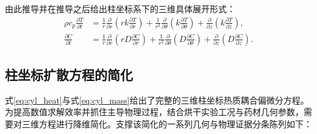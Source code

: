 \documentclass[12pt,a4paper]{ctexart}
\begin{document}
由此推导并在推导之后给出柱坐标系下的三维具体展开形式：
\begin{align}
\rho c_p\frac{\partial T}{\partial t}
&=\frac1r\frac{\partial}{\partial r}\left(rk\frac{\partial T}{\partial r}\right)
+\frac{1}{r^2}\frac{\partial}{\partial\theta}\left(k\frac{\partial T}{\partial\theta}\right)
+\frac{\partial}{\partial z}\left(k\frac{\partial T}{\partial z}\right),\label{eq:cyl_heat}\\[10pt]
\frac{\partial C}{\partial t}
&=\frac1r\frac{\partial}{\partial r}\left(rD\frac{\partial C}{\partial r}\right)
+\frac{1}{r^2}\frac{\partial}{\partial\theta}\left(D\frac{\partial C}{\partial\theta}\right)
+\frac{\partial}{\partial z}\left(D\frac{\partial C}{\partial z}\right).\label{eq:cyl_mass}
\end{align}

\subsection{柱坐标扩散方程的简化}
式\eqref{eq:cyl_heat}与式\eqref{eq:cyl_mass}给出了完整的三维柱坐标热质耦合偏微分方程。为提高数值求解效率并抓住主导物理过程，结合烘干实验工况与药材几何参数，需要对三维方程进行降维简化。支撑该简化的一系列几何与物理证据分条陈列如下：
\end{document}
